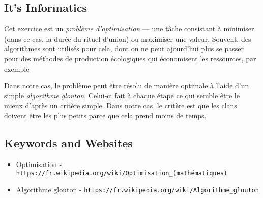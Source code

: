 \documentclass[a4paper,11pt]{report}
\newcommand{\BrochureUrlText}[1]{\texttt{#1}}
\newcommand{\taskGraphicsFolder}{..}
\begin{document}
{\centering%
\par}


\subsection*{It’s Informatics}

Cet exercice est un \emph{problème d’optimisation} — une tâche consistant à minimiser (dans ce cas, la durée du rituel d’union) ou maximiser une valeur. Souvent, des algorithmes sont utilisés pour cela, dont on ne peut ajourd’hui plus se passer pour des méthodes de production écologiques qui économisent les ressources, par exemple

Dans notre cas, le problème peut être résolu de manière optimale à l’aide d’un simple \emph{algorithme glouton}. Celui-ci fait à chaque étape ce qui semble être le mieux d’après un critère simple. Dans notre cas, le critère est que les clans doivent être les plus petits parce que cela prend moins de temps.

{\raggedright

\subsection*{Keywords and Websites}

\begin{itemize}
  \item Optimisation - \href{https://fr.wikipedia.org/wiki/Optimisation_(math\%C3\%A9matiques)}{\BrochureUrlText{https://fr.wikipedia.org/wiki/Optimisation\_(mathématiques)}}
  \item Algorithme glouton - \href{https://fr.wikipedia.org/wiki/Algorithme_glouton}{\BrochureUrlText{https://fr.wikipedia.org/wiki/Algorithme\_glouton}}
\end{itemize}


}
\end{document}
